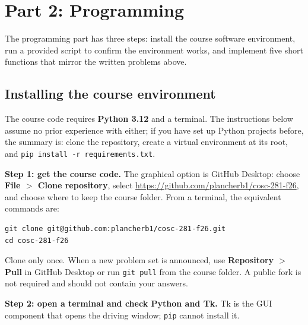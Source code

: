 \documentclass[11pt]{article}
\begin{document}
\newpage
\section*{Part 2: Programming}

The programming part has three steps: install the course software
environment, run a provided script to confirm the environment works, and
implement five short functions that mirror the written problems above.

\subsection*{Installing the course environment}

The course code requires \textbf{Python 3.12} and a terminal. The
instructions below assume no prior experience with either; if you have
set up Python projects before, the summary is: clone the repository, create a
virtual environment at its root, and \texttt{pip install -r requirements.txt}.

\textbf{Step 1: get the course code.} The graphical option is GitHub Desktop:
choose \textbf{File $>$ Clone repository}, select
\url{https://github.com/plancherb1/cosc-281-f26}, and choose where to keep the
course folder. From a terminal, the equivalent commands are:

\begin{lstlisting}[language={}]
git clone git@github.com:plancherb1/cosc-281-f26.git
cd cosc-281-f26
\end{lstlisting}

Clone only once. When a new problem set is announced, use
\textbf{Repository $>$ Pull} in GitHub Desktop or run \texttt{git pull} from
the course folder. A public fork is not required and should not contain your
answers.

\textbf{Step 2: open a terminal and check Python and Tk.} Tk is the GUI
component that opens the driving window; \texttt{pip} cannot install it.
\end{document}
